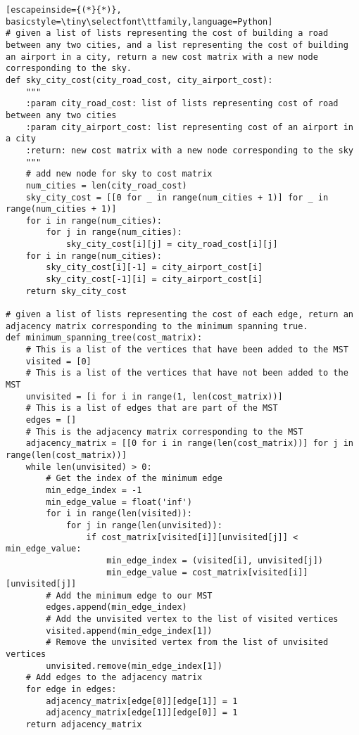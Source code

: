 \begin{figure*}[h]
\label{airports}
\begin{lstlisting}[escapeinside={(*}{*)}, basicstyle=\tiny\selectfont\ttfamily,language=Python]
# given a list of lists representing the cost of building a road between any two cities, and a list representing the cost of building an airport in a city, return a new cost matrix with a new node corresponding to the sky.
def sky_city_cost(city_road_cost, city_airport_cost):
    """
    :param city_road_cost: list of lists representing cost of road between any two cities
    :param city_airport_cost: list representing cost of an airport in a city
    :return: new cost matrix with a new node corresponding to the sky
    """
    # add new node for sky to cost matrix
    num_cities = len(city_road_cost)
    sky_city_cost = [[0 for _ in range(num_cities + 1)] for _ in range(num_cities + 1)]
    for i in range(num_cities):
        for j in range(num_cities):
            sky_city_cost[i][j] = city_road_cost[i][j]
    for i in range(num_cities):
        sky_city_cost[i][-1] = city_airport_cost[i]
        sky_city_cost[-1][i] = city_airport_cost[i]
    return sky_city_cost

# given a list of lists representing the cost of each edge, return an adjacency matrix corresponding to the minimum spanning true.
def minimum_spanning_tree(cost_matrix):
    # This is a list of the vertices that have been added to the MST
    visited = [0]
    # This is a list of the vertices that have not been added to the MST
    unvisited = [i for i in range(1, len(cost_matrix))]
    # This is a list of edges that are part of the MST
    edges = []
    # This is the adjacency matrix corresponding to the MST
    adjacency_matrix = [[0 for i in range(len(cost_matrix))] for j in range(len(cost_matrix))]
    while len(unvisited) > 0:
        # Get the index of the minimum edge
        min_edge_index = -1
        min_edge_value = float('inf')
        for i in range(len(visited)):
            for j in range(len(unvisited)):
                if cost_matrix[visited[i]][unvisited[j]] < min_edge_value:
                    min_edge_index = (visited[i], unvisited[j])
                    min_edge_value = cost_matrix[visited[i]][unvisited[j]]
        # Add the minimum edge to our MST
        edges.append(min_edge_index)
        # Add the unvisited vertex to the list of visited vertices
        visited.append(min_edge_index[1])
        # Remove the unvisited vertex from the list of unvisited vertices
        unvisited.remove(min_edge_index[1])
    # Add edges to the adjacency matrix
    for edge in edges:
        adjacency_matrix[edge[0]][edge[1]] = 1
        adjacency_matrix[edge[1]][edge[0]] = 1
    return adjacency_matrix


\end{lstlisting}
\end{figure*}
